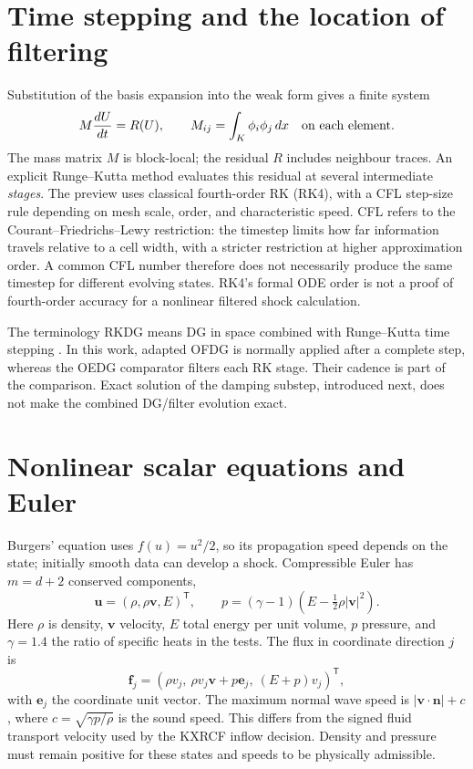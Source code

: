 \section{Time stepping and the location of filtering}
Substitution of the basis expansion into the weak form gives a finite system
\begin{equation}
 M\frac{dU}{dt}=R(U),
 \qquad M_{ij}=\int_K\phi_i\phi_j\,dx\quad\hbox{on each element}.
\end{equation}
The mass matrix $M$ is block-local; the residual $R$ includes neighbour traces.
An explicit Runge--Kutta method evaluates this residual at several intermediate
\emph{stages}. The preview uses classical fourth-order RK (RK4), with a CFL
step-size rule depending on mesh scale, order, and characteristic speed.
CFL refers to the Courant--Friedrichs--Lewy restriction: the timestep limits
how far information travels relative to a cell width, with a stricter
restriction at higher approximation order. A common CFL number therefore does
not necessarily produce the same timestep for different evolving states.
RK4's formal ODE order is not a proof of fourth-order accuracy for a nonlinear
filtered shock calculation.

The terminology RKDG means DG in space combined with Runge--Kutta time stepping
\cite{CockburnShu1998,GottliebShu1998}. In this work, adapted OFDG is normally
applied after a complete step, whereas the OEDG comparator filters each RK
stage. Their cadence is part of the comparison. Exact solution of the damping
substep, introduced next, does not make the combined DG/filter evolution exact.

\section{Nonlinear scalar equations and Euler}
Burgers' equation uses $f(u)=u^2/2$, so its propagation speed depends on the
state; initially smooth data can develop a shock. Compressible Euler has
$m=d+2$ conserved components,
\begin{equation}
 \boldsymbol u=(\rho,\rho\boldsymbol v,E)^\mathsf T,
 \qquad p=(\gamma-1)\left(E-\tfrac12\rho|\boldsymbol v|^2\right).
 \label{eq:euler-state}
\end{equation}
Here $\rho$ is density, $\boldsymbol v$ velocity, $E$ total energy per unit
volume, $p$ pressure, and $\gamma=1.4$ the ratio of specific heats in the tests.
The flux in coordinate direction $j$ is
\begin{equation}
 \boldsymbol f_j=(\rho v_j,\ \rho v_j\boldsymbol v+p\boldsymbol e_j,\ (E+p)v_j)^\mathsf T,
 \label{eq:euler-flux}
\end{equation}
with $\boldsymbol e_j$ the coordinate unit vector. The maximum normal wave
speed is $|\boldsymbol v\cdot\boldsymbol n|+c$, where
$c=\sqrt{\gamma p/\rho}$ is the sound speed. This differs from the signed
fluid transport velocity used by the KXRCF inflow decision. Density and pressure
must remain positive for these states and speeds to be physically admissible.
